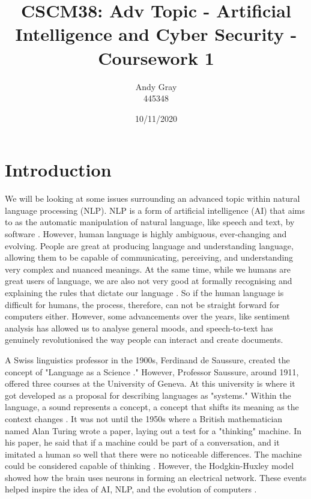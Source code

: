 \documentclass[a4paper,10pt]{article}
\begin{document}
\title{CSCM38: Adv Topic - Artificial Intelligence and Cyber Security - Coursework 1}
\author{Andy Gray\\445348}
\date{10/11/2020}

\maketitle

\section{Introduction}
\label{sec:intro}
	We will be looking at some issues surrounding an advanced topic within natural language processing (NLP).  NLP is a form of artificial intelligence  (AI) that aims to as the automatic manipulation of natural language, like speech and text, by software \cite{nlp_definition}. However, human language is highly ambiguous, ever-changing and evolving. People are great at producing language and understanding language, allowing them to be capable of communicating, perceiving, and understanding very complex and nuanced meanings. At the same time, while we humans are great users of language, we are also not very good at formally recognising and explaining the rules that dictate our language \cite{goldberg2017neural}. So if the human language is difficult for humans, the process, therefore, can not be straight forward for computers either. However, some advancements over the years, like sentiment analysis has allowed us to analyse general moods, and speech-to-text has genuinely revolutionised the way people can interact and create documents.  
	
	A Swiss linguistics professor in the 1900s, Ferdinand de Saussure, created the concept of "Language as a Science \cite{koerner2013ferdinand}." However, Professor Saussure, around 1911, offered three courses at the University of Geneva. At this university is where it got developed as a proposal for describing languages as "systems." Within the language, a sound represents a concept, a concept that shifts its meaning as the context changes \cite{nlp_history}. It was not until the 1950s where a British mathematician named Alan Turing wrote a paper, laying out a test for a "thinking" machine. In his paper, he said that if a machine could be part of a conversation, and it imitated a human so well that there were no noticeable differences. The machine could be considered capable of thinking \cite{turing2004can}. However, the Hodgkin-Huxley model showed how the brain uses neurons in forming an electrical network. These events helped inspire the idea of AI, NLP, and the evolution of computers \cite{nlp_history}.
	
\end{document}

